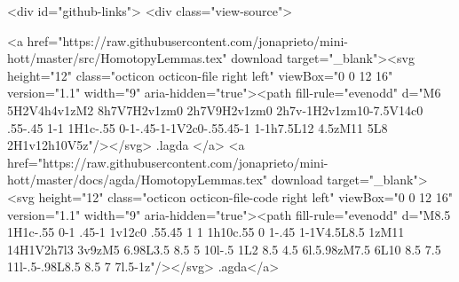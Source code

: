 {  <div id="github-links">
    <div class="view-source">
      
        <a href="https://raw.githubusercontent.com/jonaprieto/mini-hott/master/src/HomotopyLemmas.tex" download target="_blank"><svg height="12" class="octicon octicon-file right left" viewBox="0 0 12 16" version="1.1" width="9" aria-hidden="true"><path fill-rule="evenodd" d="M6 5H2V4h4v1zM2 8h7V7H2v1zm0 2h7V9H2v1zm0 2h7v-1H2v1zm10-7.5V14c0 .55-.45 1-1 1H1c-.55 0-1-.45-1-1V2c0-.55.45-1 1-1h7.5L12 4.5zM11 5L8 2H1v12h10V5z"/></svg> .lagda </a>
        <a href="https://raw.githubusercontent.com/jonaprieto/mini-hott/master/docs/agda/HomotopyLemmas.tex" download target="_blank"><svg height="12" class="octicon octicon-file-code right left" viewBox="0 0 12 16" version="1.1" width="9" aria-hidden="true"><path fill-rule="evenodd" d="M8.5 1H1c-.55 0-1 .45-1 1v12c0 .55.45 1 1 1h10c.55 0 1-.45 1-1V4.5L8.5 1zM11 14H1V2h7l3 3v9zM5 6.98L3.5 8.5 5 10l-.5 1L2 8.5 4.5 6l.5.98zM7.5 6L10 8.5 7.5 11l-.5-.98L8.5 8.5 7 7l.5-1z"/></svg> .agda</a>
      
}
